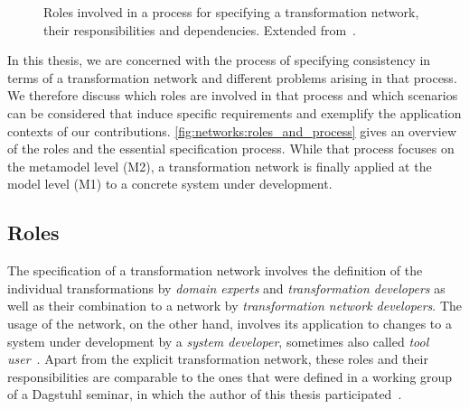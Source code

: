 \begin{figure}
    \centering
    
    \caption[Roles in a transformation network specification process]{Roles involved in a process for specifying a transformation network, their responsibilities and dependencies. Extended from~.}
    \label{fig:networks:roles_and_process}
\end{figure}

In this thesis, we are concerned with the process of specifying consistency in terms of a transformation network and different problems arising in that process.
We therefore discuss which roles are involved in that process and which scenarios can be considered that induce specific requirements and exemplify the application contexts of our contributions.
\autoref{fig:networks:roles_and_process} gives an overview of the roles and the essential specification process.
While that process focuses on the metamodel level (M2), a transformation network is finally applied at the model level (M1) to a concrete system under development.

\subsection{Roles}

The specification of a transformation network involves the definition of the individual transformations by \emph{domain experts} and \emph{transformation developers} as well as their combination to a network by \emph{transformation network developers}.
The usage of the network, on the other hand, involves its application to changes to a system under development by a \emph{system developer}, sometimes also called \emph{tool user}~\cite{klare2019dagstuhl}.
Apart from the explicit transformation network, these roles and their responsibilities are comparable to the ones that were defined in a working group of a Dagstuhl seminar, in which the author of this thesis participated~\cite{klare2019dagstuhl}.

